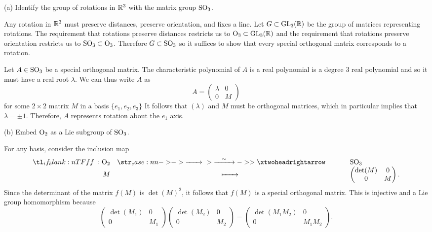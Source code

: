 \documentclass{lkx_pset}
\begin{document}
\begin{problem}{5}
\end{problem}
\begin{parts}
  \begin{part}{(a)}
    Identify the group of rotations in $\mathbb{R}^3$ with the matrix group $\operatorname{SO}_3$.
  \end{part}

  Any rotation in $\mathbb{R}^3$ must preserve distances, preserve orientation, and fixes a line. Let $G\subset \operatorname{GL}_3(\mathbb{R})$ be the group of matrices representing rotations. The requirement that rotations preserve distances restricts us to ${\operatorname{O}}_3\subset \operatorname{GL}_3(\mathbb{R})$ and the requirement that rotations preserve orientation restricts us to $\operatorname{SO}_3\subset {\operatorname{O}}_3$. Therefore $G\subset \operatorname{SO}_3$ so it suffices to show that every special orthogonal matrix corresponds to a rotation. 

  Let $A\in \operatorname{SO}_3$ be a special orthogonal matrix. The characteristic polynomial of $A$ is a real polynomial is a degree $3$ real polynomial and so it must have a real root $\lambda$. We can thus write $A$ as
  \[
    A = \begin{pmatrix} 
      \lambda & 0\\
      0 & M
      \end{pmatrix}
  \]
  for some $2\times 2$ matrix $M$ in a basis $\{e_1,e_2,e_3\}$ It follows that $(\lambda)$ and $M$ must be orthogonal matrices, which in particular implies that $\lambda=\pm 1$. Therefore, $A$ represents rotation about the $e_1$ axis.

  \begin{part}{(b)}
    Embed ${\operatorname{O}}_2$ as a Lie subgroup of $\operatorname{SO}_3$.
  \end{part}

  For any basis, consider the inclusion map
  \[
    \lkxfunc{f}{\O_2}{\SO_3}{M}{\begin{pmatrix}\det(M) & 0 \\ 0 & M\end{pmatrix}.}
  \]
  Since the determinant of the matrix $f(M)$ is $\det(M)^2$, it follows that $f(M)$ is a special orthogonal matrix. This is injective and a Lie group homomorphism because 
  \[
    \begin{pmatrix}\det(M_1) & 0 \\ 0 & M_1\end{pmatrix}
    \begin{pmatrix}\det(M_2) & 0 \\ 0 & M_2\end{pmatrix}
    =
    \begin{pmatrix}\det(M_1M_2) & 0 \\ 0 & M_1M_2\end{pmatrix}.
  \]
\end{parts}
\end{document}
